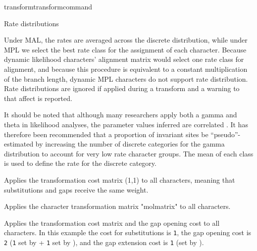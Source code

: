 \begin{command}{transform}{transformcommand}
\begin{arguments}
\begin{argumentgroup}{Rate distributions}
            \begin{statement}
                Under MAL, the rates are averaged across the
                discrete distribution, while under MPL we select the best
                rate class for the assignment of each character. Because
                dynamic likelihood characters' alignment matrix would select
                one rate class for alignment, and because this procedure is equivalent to a
                constant multiplication of the branch length, dynamic MPL
                characters do not support rate distribution. Rate distributions are
               ignored if applied during a transform and a
                warning to that affect is reported.
            \end{statement}

            \begin{statement}
                It should be noted that although many researchers apply both
                a gamma and theta in likelihood analyses, the parameter
                values inferred are correlated \cite{sullivan1999}.  It has
                therefore been recommended that a proportion of invariant
                sites be ``pseudo''-estimated by increasing the number of
                discrete categories for the gamma distribution to account
                for very low rate character groups. The mean of each class
                is used to define the rate for the discrete category.
            \end{statement}
            
        \end{argumentgroup}

    \end{arguments}


    \begin{poyexamples} 
            {Applies the transformation cost matrix (1,1) to all characters,
            meaning that substitutions and gaps receive the same weight.}

            {Applies the character transformation matrix "molmatrix" to all
            characters.}
                    
            {Applies the transformation cost matrix and the gap opening cost
            to all characters. In this example the cost for substitutions is \texttt{1},
            the gap opening cost is \texttt{2} (\texttt{1} set by 
            + \texttt{1} set by ), and the gap extension cost is \texttt{1}
            (set by ).}
        

\end{poyexamples}
\end{command}
